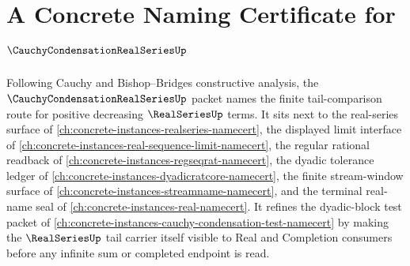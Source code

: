 \chapter{A Concrete Naming Certificate for $\CauchyCondensationRealSeriesUp$}
\label{ch:concrete-instances-cauchy-condensation-real-series-namecert}

Following Cauchy and Bishop--Bridges constructive analysis, the $\CauchyCondensationRealSeriesUp$ packet names the finite tail-comparison route for positive decreasing $\RealSeriesUp$ terms. It sits next to the real-series surface of \autoref{ch:concrete-instances-realseries-namecert}, the displayed limit interface of \autoref{ch:concrete-instances-real-sequence-limit-namecert}, the regular rational readback of \autoref{ch:concrete-instances-regseqrat-namecert}, the dyadic tolerance ledger of \autoref{ch:concrete-instances-dyadicratcore-namecert}, the finite stream-window surface of \autoref{ch:concrete-instances-streamname-namecert}, and the terminal real-name seal of \autoref{ch:concrete-instances-real-namecert}. It refines the dyadic-block test packet of \autoref{ch:concrete-instances-cauchy-condensation-test-namecert} by making the $\RealSeriesUp$ tail carrier itself visible to Real and Completion consumers before any infinite sum or completed endpoint is read.

